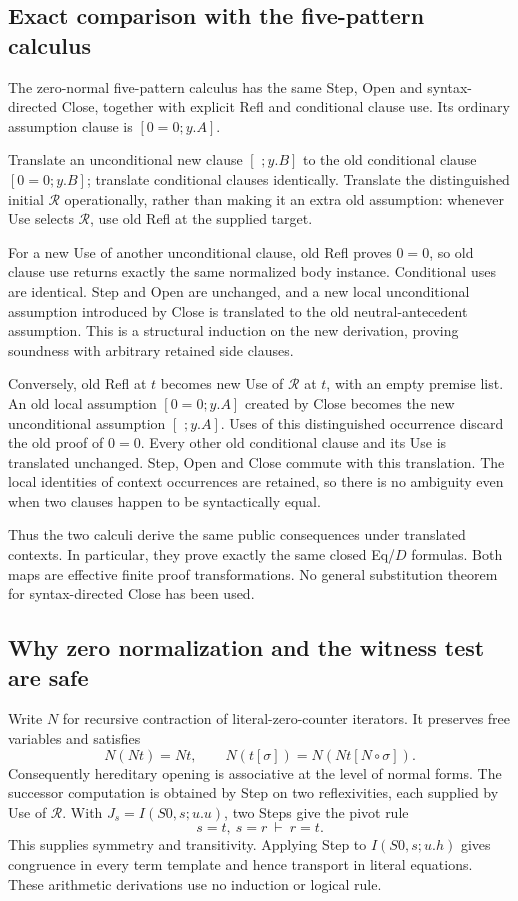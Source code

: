 \subsection{Exact comparison with the five-pattern calculus}
The zero-normal five-pattern calculus has the same Step, Open and
syntax-directed Close, together with explicit Refl and conditional clause
use. Its ordinary assumption clause is
\([0=0;y.A]\).

Translate an unconditional new clause \([\,\,;y.B]\) to the old
conditional clause \([0=0;y.B]\); translate conditional clauses
identically. Translate the distinguished initial \(\mathcal R\)
operationally, rather than making it an extra old assumption: whenever
Use selects \(\mathcal R\), use old Refl at the supplied target.

For a new Use of another unconditional clause, old Refl proves \(0=0\),
so old clause use returns exactly the same normalized body instance.
Conditional uses are identical. Step and Open are unchanged, and a
new local unconditional assumption introduced by Close is translated to
the old neutral-antecedent assumption. This is a structural induction on
the new derivation, proving soundness with arbitrary retained side
clauses.

Conversely, old Refl at \(t\) becomes new Use of \(\mathcal R\) at \(t\),
with an empty premise list. An old local assumption
\([0=0;y.A]\) created by Close becomes the new unconditional assumption
\([\,\,;y.A]\). Uses of this distinguished occurrence discard the old
proof of \(0=0\). Every other old conditional clause and its Use is
translated unchanged. Step, Open and Close commute with this translation.
The local identities of context occurrences are retained, so there is
no ambiguity even when two clauses happen to be syntactically equal.

Thus the two calculi derive the same public consequences under translated
contexts. In particular, they prove exactly the same closed Eq/\(D\)
formulas. Both maps are effective finite proof transformations.
No general substitution theorem for syntax-directed Close has been used.

\subsection{Why zero normalization and the witness test are safe}
Write \(N\) for recursive contraction of literal-zero-counter iterators.
It preserves free variables and satisfies
\[
 N(Nt)=Nt,\qquad
 N(t[\sigma])=N(Nt[N\circ\sigma]).
\]
Consequently hereditary opening is associative at the level of normal
forms. The successor computation is obtained by Step on two
reflexivities, each supplied by Use of \(\mathcal R\).
With \(J_s=I(S0,s;u.u)\), two Steps give the pivot rule
\[
 s=t,\ s=r\ \vdash\ r=t.
\]
This supplies symmetry and transitivity. Applying Step to
\(I(S0,s;u.h)\) gives congruence in every term template and hence transport
in literal equations. These arithmetic derivations use no induction
or logical rule.

